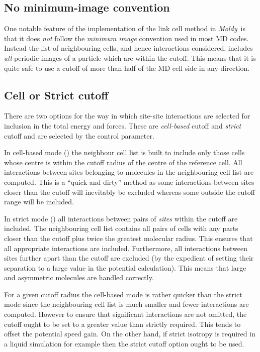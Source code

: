 \documentclass[a4paper,twoside]{report}
\newcommand{\moldy}{\emph{Moldy}}
\begin{document}
\subsection{No minimum-image convention}
One notable feature of the implementation of the link cell method in
\moldy\ is that it does \emph{not} follow the \emph{minimum image}
convention used in most MD codes.  Instead the list of neighbouring
cells, and hence interactions considered, includes \emph{all} periodic
images of a particle which are within the cutoff.  This means that it
is quite safe to use a cutoff of more than half of the MD cell side in
any direction.  

\subsection{Cell or Strict cutoff}
\label{sec:strict-cutoff}
There are two options for the way in which site-site interactions are
selected for inclusion in the total energy and forces.  These are
\emph{cell-based} cutoff and \emph{strict} cutoff and are selected
by the  control parameter.

In cell-based mode () the neighbour cell list is
built to include only those cells whose centre is within the cutoff
radius of the centre of the reference cell.  All interactions between
sites belonging to molecules in the neighbouring cell list are
computed.  This is a ``quick and dirty'' method as some interactions
between sites closer than the cutoff will inevitably be excluded
whereas some outside the cutoff range will be included.

In strict mode () all interactions between pairs
of \emph{sites} within the cutoff are included.  The neighbouring cell
list contains all pairs of cells with any parts closer than the cutoff
plus twice the greatest molecular radius.  This ensures that all
appropriate interactions are included.  Furthermore, all interactions
between sites further apart than the cutoff are excluded (by the
expedient of setting their separation to a large value in the
potential calculation).  This means that large and asymmetric
molecules are handled correctly.  

For a given cutoff radius the cell-based mode is rather quicker than
the strict mode since the neighbouring cell list is much smaller and
fewer interactions are computed.  However to ensure that significant
interactions are not omitted, the cutoff ought to be set to a
greater value than strictly required.    This tends to offset the
potential speed gain.   On the other hand, if strict isotropy is
required in a liquid simulation for example then the strict cutoff
option ought to be used.
\end{document}
